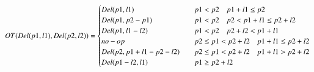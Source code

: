 \begin{equation}
OT(Del(p1,l1),Del(p2,l2))= \begin{cases}
Del(p1,l1) \quad & p1<p2 \quad p1+l1 \le p2 \\
Del(p1,p2-p1) \quad & p1<p2 \quad p2<p1+l1 \le p2+l2\\
Del(p1,l1-l2) \quad & p1<p2 \quad p2+l2<p1+l1\\
no-op \quad & p2 \le p1 < p2+l2 \quad p1+l1 \le p2+l2\\
Del(p2,p1+l1-p2-l2) \quad & p2 \le p1 <p2+l2 \quad  p1+l1>p2+l2\\
Del(p1-l2,l1) \quad & p1 \ge p2+l2  \end{cases}\\
\end{equation}

